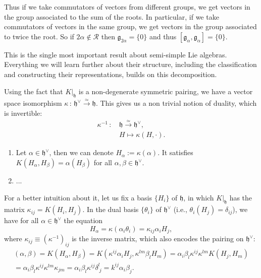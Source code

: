 Thus if we take commutators of vectors from different groups, we get vectors in the group associated to the sum of the roots. In particular, if we take commutators of vectors in the same group, we get vectors in the group associated to twice the root. So if \(2\alpha \notin \mathcal{R}\) then \(\mathfrak{g}_{2\alpha} = \{0\}\) and thus \([\mathfrak{g}_\alpha, \mathfrak{g}_\alpha] = \{0\}\).

This is the single most important result about semi-simple Lie algebras. Everything we will learn further about their structure, including the classification and constructing their representations, builds on this decomposition.

\begin{definition}
    Using the fact that \(K|_{\mathfrak{h}}\) is a non-degenerate symmetric pairing, we have a vector space isomorphism \(\kappa \,:\, \mathfrak{h}^\vee \xrightarrow{\simeq} \mathfrak{h}\). This gives us a non trivial notion of duality, which is invertible:
    \[
        \begin{aligned}
            \kappa^{-1} \,:\, & \mathfrak{h} \xrightarrow{\simeq} \mathfrak{h}^\vee, \\
                              & H \mapsto \kappa(H, \cdot).
        \end{aligned}
    \]
    \begin{enumerate}
        \item Let \(\alpha \in \mathfrak{h}^\vee\), then we can denote \(H_{\alpha} := \kappa(\alpha)\). It satisfies \(K(H_{\alpha}, H_{\beta}) = \alpha(H_{\beta})\) for all \(\alpha, \beta \in \mathfrak{h}^\vee\).
        \item ...
    \end{enumerate}
\end{definition}

For a better intuition about it, let us fix a basis \(\{H_i\}\) of \(\mathfrak{h}\), in which \(K|_{\mathfrak{h}}\) has the matrix \(\kappa_{ij} = K(H_i, H_j)\). In the dual basis \(\{\theta_i\}\) of \(\mathfrak{h}^\vee\) (i.e., \(\theta_i(H_j) = \delta_{ij}\)), we have for all \(\alpha \in \mathfrak{h}^\vee\) the equation
\[
    H_\alpha = \kappa(\alpha_i \theta_i) = \kappa_{ij} \alpha_i H_j,
\]
where \(\kappa_{ij} \equiv (\kappa^{-1})_{ij}\) is the inverse matrix, which also encodes the pairing on \(\mathfrak{h}^\vee\):
\[
    \begin{aligned}
        (\alpha, \beta) = K(H_\alpha, H_\beta) = K(\kappa^{ij}\alpha_i H_j, \kappa^{lm}\beta_l H_m) = \alpha_i \beta_l \kappa^{ij} \kappa^{lm} K(H_j, H_m) \\
        = \alpha_i \beta_l \kappa^{ij} \kappa^{lm} \kappa_{jm} = \alpha_i \beta_l \kappa^{ij} \delta^l_{\ j} = k^{ij} \alpha_i \beta_j.
    \end{aligned}
\]

